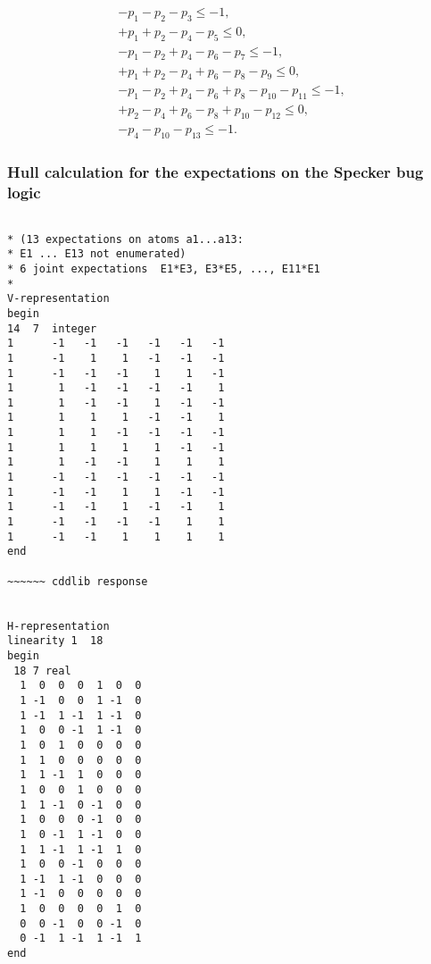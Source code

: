 \documentclass[%
  twocolumn,
 showpacs,
 showkeys,
 preprintnumbers,
 amsmath,amssymb,
 aps,
  pra,
  longbibliography,
 floatfix,
 ]{revtex4-1}
\begin{document}
\begin{eqnarray}
- p_1  - p_2  - p_3                                                                                        \le    -1 , \\
+ p_1  + p_2         - p_4  - p_5                                                                          \le     0 , \\
- p_1  - p_2         + p_4         - p_6  - p_7                                                            \le    -1 ,  \\
+ p_1  + p_2         - p_4         + p_6         - p_8  - p_9                                              \le     0 , \\
- p_1  - p_2         + p_4         - p_6         + p_8         - p_{10}  - p_{11}                          \le    -1 ,  \\
       + p_2         - p_4         + p_6         - p_8         + p_{10}            - p_{12}                \le     0 , \\
                     - p_4                                     - p_{10}                      - p_{13}      \le    -1
.
\label{2017-b-sb-p-c}
\end{eqnarray}

\subsubsection{Hull calculation for the expectations on the Specker bug logic}

{ \begin{lstlisting}[backgroundcolor=\color{yellow!10},framerule=0pt,breaklines=true, frame=tb]

* (13 expectations on atoms a1...a13:
* E1 ... E13 not enumerated)
* 6 joint expectations  E1*E3, E3*E5, ..., E11*E1
*
V-representation
begin
14  7  integer
1      -1   -1   -1   -1   -1   -1
1      -1    1    1   -1   -1   -1
1      -1   -1   -1    1    1   -1
1       1   -1   -1   -1   -1    1
1       1   -1   -1    1   -1   -1
1       1    1    1   -1   -1    1
1       1    1   -1   -1   -1   -1
1       1    1    1    1   -1   -1
1       1   -1   -1    1    1    1
1      -1   -1   -1   -1   -1   -1
1      -1   -1    1    1   -1   -1
1      -1   -1    1   -1   -1    1
1      -1   -1   -1   -1    1    1
1      -1   -1    1    1    1    1
end

~~~~~~ cddlib response


H-representation
linearity 1  18
begin
 18 7 real
  1  0  0  0  1  0  0
  1 -1  0  0  1 -1  0
  1 -1  1 -1  1 -1  0
  1  0  0 -1  1 -1  0
  1  0  1  0  0  0  0
  1  1  0  0  0  0  0
  1  1 -1  1  0  0  0
  1  0  0  1  0  0  0
  1  1 -1  0 -1  0  0
  1  0  0  0 -1  0  0
  1  0 -1  1 -1  0  0
  1  1 -1  1 -1  1  0
  1  0  0 -1  0  0  0
  1 -1  1 -1  0  0  0
  1 -1  0  0  0  0  0
  1  0  0  0  0  1  0
  0  0 -1  0  0 -1  0
  0 -1  1 -1  1 -1  1
end

\end{lstlisting}  }
\end{document}

